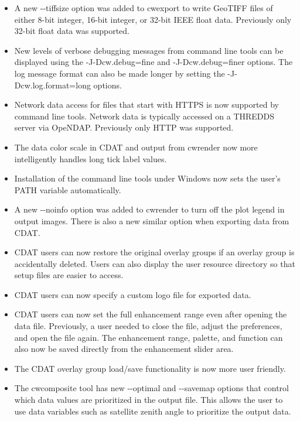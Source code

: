 \begin{itemize}

\item A new -{-}tiffsize option was added to cwexport to write GeoTIFF 
files of either 8-bit integer, 16-bit integer, or 32-bit IEEE float data.
Previously only 32-bit float data was supported.

\item New levels of verbose debugging messages from command line tools can be 
displayed using the -J-Dcw.debug=fine and -J-Dcw.debug=finer options.  The log
message format can also be made longer by setting the -J-Dcw.log.format=long
options.

\item Network data access for files that start with HTTPS is now supported 
by command line tools.  Network data is typically accessed on a THREDDS server
via OpeNDAP.  Previously only HTTP was supported.

\item The data color scale in CDAT and output from cwrender now more 
intelligently handles long tick label values.

\item Installation of the command line tools under Windows now sets the 
user's PATH variable automatically.

\item A new -{-}noinfo option was added to cwrender to turn off the plot 
legend in output images.  There is also a new similar option when exporting 
data from CDAT.

\item CDAT users can now restore the original overlay groups if an overlay
group is accidentally deleted.  Users can also display the user resource
directory so that setup files are easier to access.

\item CDAT users can now specify a custom logo file for exported data.

\item CDAT users can now set the full enhancement range even after opening
the data file.  Previously, a user needed to close the file, adjust the 
preferences, and open the file again.  The enhancement range, palette, 
and function can also now be saved directly from the enhancement slider area.

\item The CDAT overlay group load/save functionality is now more user 
friendly.

\item The cwcomposite tool has new -{-}optimal and -{-}savemap options 
that control which data values are prioritized in the output file.  This allows
the user to use data variables such as satellite zenith angle to prioritize
the output data.


\end{itemize}
